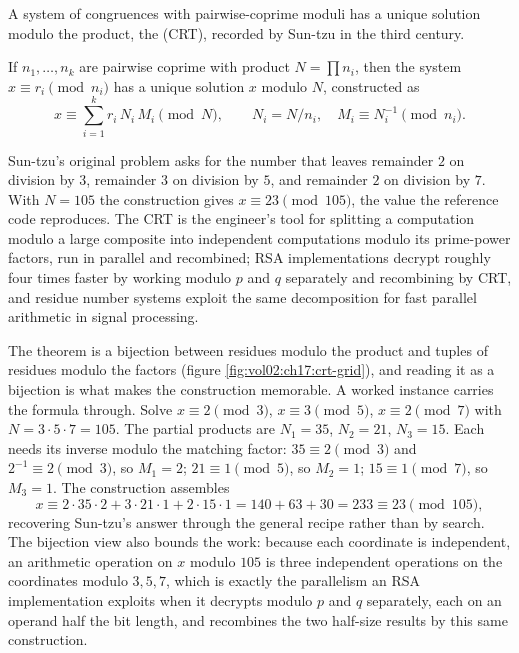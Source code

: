 A system of congruences with pairwise-coprime moduli has a unique
solution modulo the product, the 
(CRT), recorded by Sun-tzu in the third century.

\begin{principle}
If $n_{1}, \ldots, n_{k}$ are pairwise coprime with product $N =
\prod n_{i}$, then the system $x \equiv r_{i} \pmod{n_{i}}$ has a
unique solution $x$ modulo $N$, constructed as
\[
x \equiv \sum_{i=1}^{k} r_{i}\, N_{i}\, M_{i} \pmod{N},
\qquad N_{i} = N / n_{i},
\quad M_{i} \equiv N_{i}^{-1} \pmod{n_{i}}.
\]
\end{principle}

Sun-tzu's original problem asks for the number that leaves remainder
$2$ on division by $3$, remainder $3$ on division by $5$, and
remainder $2$ on division by $7$. With $N = 105$ the construction
gives $x \equiv 23 \pmod{105}$, the value the reference code
reproduces. The CRT is the engineer's tool for splitting a
computation modulo a large composite into independent computations
modulo its prime-power factors, run in parallel and recombined; RSA
implementations decrypt roughly four times faster by working modulo
$p$ and $q$ separately and recombining by CRT, and residue number
systems exploit the same decomposition for fast parallel arithmetic
in signal processing.

The theorem is a bijection between residues modulo the product and
tuples of residues modulo the factors (figure
\ref{fig:vol02:ch17:crt-grid}), and reading it as a bijection is
what makes the construction memorable. A worked instance carries the
formula through. Solve $x \equiv 2 \pmod 3$, $x \equiv 3 \pmod 5$,
$x \equiv 2 \pmod 7$ with $N = 3 \cdot 5 \cdot 7 = 105$. The partial
products are $N_{1} = 35$, $N_{2} = 21$, $N_{3} = 15$. Each needs its
inverse modulo the matching factor: $35 \equiv 2 \pmod 3$ and
$2^{-1} \equiv 2 \pmod 3$, so $M_{1} = 2$; $21 \equiv 1 \pmod 5$, so
$M_{2} = 1$; $15 \equiv 1 \pmod 7$, so $M_{3} = 1$. The construction
assembles
\[
x \equiv 2 \cdot 35 \cdot 2 + 3 \cdot 21 \cdot 1 + 2 \cdot 15 \cdot 1
= 140 + 63 + 30 = 233 \equiv 23 \pmod{105},
\]
recovering Sun-tzu's answer through the general recipe rather than by
search. The bijection view also bounds the work: because each
coordinate is independent, an arithmetic operation on $x$ modulo
$105$ is three independent operations on the coordinates modulo
$3, 5, 7$, which is exactly the parallelism an RSA implementation
exploits when it decrypts modulo $p$ and $q$ separately, each on an
operand half the bit length, and recombines the two half-size results
by this same construction.

